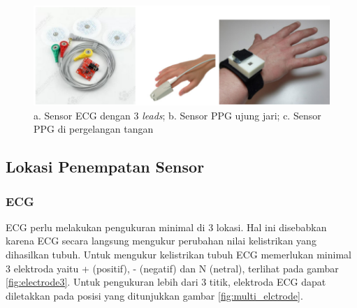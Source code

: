 \begin{figure}[H]
    \centering
    \includegraphics[scale=0.3]{images/sensors.png}
    \caption{a. Sensor ECG dengan 3 \textit{leads}; b. Sensor PPG ujung jari; c. Sensor PPG di pergelangan tangan}
    \label{fig:ecg_n_ppg}
\end{figure}

\subsection{Lokasi Penempatan Sensor}
\subsubsection{ECG}
ECG perlu melakukan pengukuran minimal di 3 lokasi. Hal ini disebabkan karena ECG secara langsung mengukur perubahan nilai kelistrikan yang dihasilkan tubuh. Untuk mengukur kelistrikan tubuh ECG memerlukan minimal 3 elektroda yaitu + (positif), - (negatif) dan N (netral), terlihat pada gambar \ref{fig:electrode3}. Untuk pengukuran lebih dari 3 titik, elektroda ECG dapat diletakkan pada posisi yang ditunjukkan gambar \ref{fig:multi_elctrode}.

